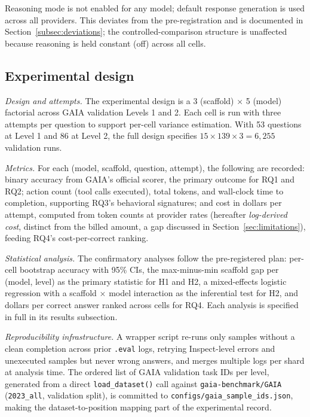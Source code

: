 \documentclass[10pt]{article} %
\begin{document}
        Reasoning mode is not enabled for any model; default response generation is used across all providers. This deviates from the pre-registration and is documented in Section~\ref{subsec:deviations}; the controlled-comparison structure is unaffected because reasoning is held constant (off) across all cells.

    \subsection{Experimental design}\label{subsec:experimental_design}
    
        \textit{Design and attempts.} The experimental design is a 3 (scaffold) $\times$ 5 (model) factorial across GAIA validation Levels 1 and 2. Each cell is run with three attempts per question to support per-cell variance estimation. With 53 questions at Level 1 and 86 at Level 2, the full design specifies $15 \times 139 \times 3 = 6{,}255$ validation runs.
        
        \textit{Metrics.} For each (model, scaffold, question, attempt), the following are recorded: binary accuracy from GAIA's official scorer, the primary outcome for RQ1 and RQ2; action count (tool calls executed), total tokens, and wall-clock time to completion, supporting RQ3's behavioral signatures; and cost in dollars per attempt, computed from token counts at provider rates (hereafter \emph{log-derived cost}, distinct from the billed amount, a gap discussed in Section~\ref{sec:limitations}), feeding RQ4's cost-per-correct ranking.
        
        \textit{Statistical analysis.} The confirmatory analyses follow the pre-registered plan: per-cell bootstrap accuracy with 95\% CIs, the max-minus-min scaffold gap per (model, level) as the primary statistic for H1 and H2, a mixed-effects logistic regression with a scaffold $\times$ model interaction as the inferential test for H2, and dollars per correct answer ranked across cells for RQ4. Each analysis is specified in full in its results subsection.
        
        \textit{Reproducibility infrastructure.} A wrapper script re-runs only samples without a clean completion across prior \texttt{.eval} logs, retrying Inspect-level errors and unexecuted samples but never wrong answers, and merges multiple logs per shard at analysis time. The ordered list of GAIA validation task IDs per level, generated from a direct \texttt{load\_dataset()} call against \texttt{gaia-benchmark/GAIA} (\texttt{2023\_all}, validation split), is committed to \texttt{configs/gaia\_sample\_ids.json}, making the dataset-to-position mapping part of the experimental record.
        
\end{document}
